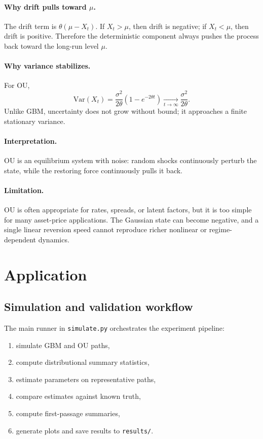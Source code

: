 \documentclass[11pt]{article}
\newcommand{\Var}{\mathrm{Var}}
\begin{document}
\paragraph{Why drift pulls toward $\mu$.}
The drift term is $\theta(\mu-X_t)$. If $X_t>\mu$, then drift is negative; if $X_t<\mu$, then drift is positive. Therefore the deterministic component always pushes the process back toward the long-run level $\mu$.

\paragraph{Why variance stabilizes.}
For OU,
\begin{equation}
  \Var(X_t) = \frac{\sigma^2}{2\theta}\left(1-e^{-2\theta t}\right)
  \xrightarrow[t\to\infty]{}
  \frac{\sigma^2}{2\theta}.
\end{equation}
Unlike GBM, uncertainty does not grow without bound; it approaches a finite stationary variance.

\paragraph{Interpretation.}
OU is an equilibrium system with noise: random shocks continuously perturb the state, while the restoring force continuously pulls it back.

\paragraph{Limitation.}
OU is often appropriate for rates, spreads, or latent factors, but it is too simple for many asset-price applications. The Gaussian state can become negative, and a single linear reversion speed cannot reproduce richer nonlinear or regime-dependent dynamics.

\section{Application}

\subsection{Simulation and validation workflow}

The main runner in \texttt{simulate.py} orchestrates the experiment pipeline:
\begin{enumerate}[leftmargin=1.5em]
  \item simulate GBM and OU paths,
  \item compute distributional summary statistics,
  \item estimate parameters on representative paths,
  \item compare estimates against known truth,
  \item compute first-passage summaries,
  \item generate plots and save results to \texttt{results/}.
\end{enumerate}
\end{document}
